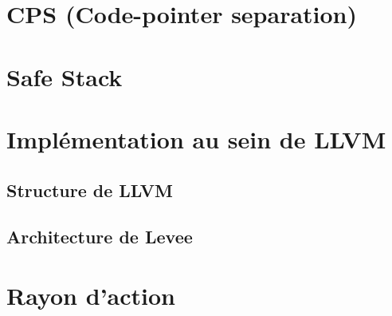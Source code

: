 \section{CPS (Code-pointer separation)}


\section{Safe Stack}
\label{section:safeStack}


\section{Implémentation au sein de LLVM}

%

\subsection{Structure de LLVM}


\subsection{Architecture de Levee}


\section{Rayon d'action}


